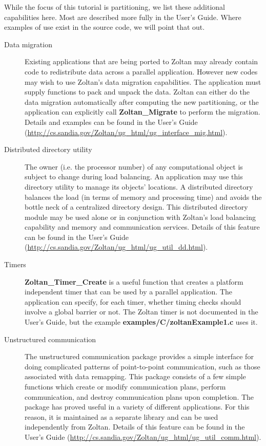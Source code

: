 While the focus of this tutorial is partitioning, we list these additional
capabilities here.  Most are described more fully in the User's Guide.
Where examples of use exist in the source code, we will point that out.

\begin{description}
\item [Data migration]
Existing applications that are being ported to Zoltan may already contain code to 
redistribute data across a parallel application.  However new codes may wish to
use Zoltan's data migration capabilities.  The application must supply functions
to pack and unpack the data.  Zoltan can either do the data migration automatically
after computing the new partitioning, or the application can explicitly call
\textbf{Zoltan\_Migrate} to perform the migration.  
Details and examples can be
found in the User's Guide
(\url{http://cs.sandia.gov/Zoltan/ug\_html/ug\_interface\_mig.html}).


\item [Distributed directory utility]
The owner (i.e. the processor number) of any computational object is subject to 
change during load balancing. An application may use this directory utility to 
manage its objects' locations. A distributed directory balances the load (in terms 
of memory and processing time) and avoids the bottle neck of a centralized directory design.
This distributed directory module may be used alone or in conjunction with Zoltan's 
load balancing capability and memory and communication services.
Details of this feature can be found in the User's Guide
(\url{http://cs.sandia.gov/Zoltan/ug\_html/ug\_util\_dd.html}).

\item [Timers]
\textbf{Zoltan\_Timer\_Create} is a useful function 
that creates a platform independent
timer that can be used by a parallel application.  The application can
specify, for each timer, whether timing checks should involve a
global barrier or not.  The Zoltan timer is not documented in the User's
Guide, but the example \textbf{examples/C/zoltanExample1.c} uses it.

\item [Unstructured communication]
The unstructured communication package provides a simple interface for 
doing complicated patterns of point-to-point communication, such as those 
associated with data remapping. This package consists of a few simple functions 
which create or modify communication plans, perform communication, and destroy 
communication plans upon completion. The package has proved useful in a 
variety of different applications. For this reason, it is maintained as a separate 
library and can be used independently from Zoltan.
Details of this feature can be found in the User's Guide
(\url{http://cs.sandia.gov/Zoltan/ug\_html/ug\_util\_comm.html}).


\end{description}
